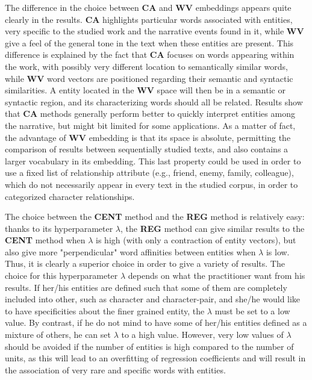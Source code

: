 \documentclass[
twocolumn,
]{ceurart}
\begin{document}
The difference in the choice between \textbf{CA} and \textbf{WV} embeddings appears quite clearly in the results. \textbf{CA} highlights particular words associated with entities, very specific to the studied work and the narrative events found in it, while \textbf{WV} give a feel of the general tone in the text when these entities are present. This difference is explained by the fact that \textbf{CA} focuses on words appearing within the work, with possibly very different location to semantically similar words, while \textbf{WV} word vectors are positioned regarding their semantic and syntactic similarities. A entity located in the \textbf{WV} space will then be in a semantic or syntactic region, and its characterizing words should all be related. Results show that \textbf{CA} methods generally perform better to quickly interpret entities among the narrative, but might bit limited for some applications. As a matter of fact, the advantage of \textbf{WV} embedding is that its space is absolute, permitting the comparison of results between sequentially studied texts, and also contains a larger vocabulary in its embedding. This last property could be used in order to use a fixed list of relationship attribute (e.g., friend, enemy, family, colleague), which do not necessarily appear in every text in the studied corpus, in order to categorized character relationships.

The choice between the \textbf{CENT} method and the \textbf{REG} method is relatively easy: thanks to its hyperparameter $\lambda$, the \textbf{REG} method can give similar results to the \textbf{CENT} method when $\lambda$ is high (with only a contraction of entity vectors), but also give more "perpendicular" word affinities between entities when $\lambda$ is low. Thus, it is clearly a superior choice in order to give a variety of results. The choice for this hyperparameter $\lambda$ depends on what the practitioner want from his results. If her/his entities are defined such that some of them are completely included into other, such as character and character-pair, and she/he would like to have specificities about the finer grained entity, the $\lambda$ must be set to a low value. By contrast, if he do not mind to have some of her/his entities defined as a mixture of others, he can set $\lambda$ to a high value. However, very low values of $\lambda$ should be avoided if the number of entities is high compared to the number of units, as this will lead to an overfitting of regression coefficients and will result in the association of very rare and specific words with entities.
\end{document}
